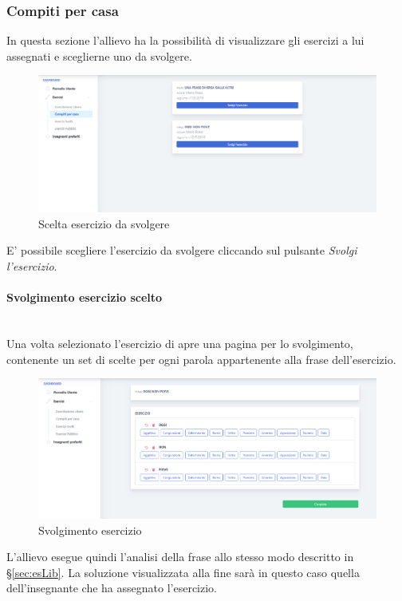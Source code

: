         \newpage
  		\subsubsection{Compiti per casa}
 		  In questa sezione l'allievo ha la possibilità di visualizzare gli esercizi a lui assegnati e sceglierne uno da svolgere.
        	\begin{figure}[H]
            	\centering
            	\includegraphics[width=17cm]{sez/img/studente/compitopercasa.PNG} 
            	\caption{Scelta esercizio da svolgere}\label{fig:1}
        	\end{figure}

		  E' possibile scegliere l'esercizio da svolgere cliccando sul pulsante \textit{Svolgi l'esercizio}. 
		  
		  
		    \paragraph{Svolgimento esercizio scelto}\mbox{}\\
		    Una volta selezionato l'esercizio di apre una pagina per lo svolgimento, contenente un set di scelte per ogni parola appartenente alla frase dell'esercizio.     
       
        	\begin{figure}[H]
            	\centering
            	\includegraphics[width=17cm]{sez/img/studente/svolgimentoesercizio.PNG} 
            	\caption{Svolgimento esercizio}\label{fig:1}
        	\end{figure}      
	L'allievo esegue quindi l'analisi della frase allo stesso modo descritto in \S\ref{sec:esLib}. La soluzione visualizzata alla fine sarà in questo caso quella dell'insegnante che ha assegnato l'esercizio. 
	
